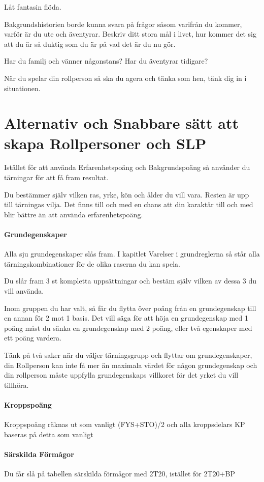 \documentclass[a4paper, 10pt, titlepage]{article}
\begin{document}
Låt fantasin flöda.

Bakgrundshistorien borde kunna svara på frågor såsom varifrån du kommer, varför är du ute
och äventyrar. Beskriv ditt stora mål i livet, hur kommer det sig att du är så duktig som du är
på vad det är du nu gör.

Har du familj och vänner någonstans? Har du äventyrar tidigare?

När du spelar din rollperson så ska du agera och tänka som hen, tänk dig in i situationen.

\section{Alternativ och Snabbare sätt att skapa Rollpersoner och SLP}
Istället för att använda Erfarenhetspoäng och Bakgrundspoäng så använder du tärningar för att
få fram resultat.

Du bestämmer själv vilken ras, yrke, kön och ålder du vill vara. Resten är upp till tärningas vilja.
Det finns till och med en chans att din karaktär till och med blir bättre än att använda erfarenhetspoäng.

\paragraph{Grundegenskaper} Alla sju grundegenskaper slås fram. I kapitlet Varelser i grundreglerna så står
alla tärningskombinationer för de olika raserna du kan spela.

Du slår fram 3 st kompletta uppsättningar och bestäm själv vilken av dessa 3 du vill använda.

Inom gruppen du har valt, så får du flytta över poäng från en grundegenskap till en annan för 2 mot 1
basis. Det vill säga för att höja en grundegenskap med 1 poäng måst du sänka en grundegenskap med 2 poäng,
eller två egenskaper med ett poäng vardera.

Tänk på två saker när du väljer tärningsgrupp och flyttar om grundegenskaper, din Rollperson kan inte få
mer än maximala värdet för någon grundegenskap och din rollperson måste uppfylla grundegenskaps villkoret
för det yrket du vill tillhöra.

\paragraph{Kroppspoäng} Kroppspoäng räknas ut som vanligt (FYS+STO)/2 och alla kroppsdelars KP baseras på
detta som vanligt

\paragraph{Särskilda Förmågor} Du får slå på tabellen särskilda förmågor med 2T20, istället för 2T20+BP
\end{document}
